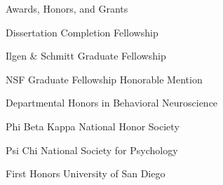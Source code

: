 
\begin{rubric}{Awards, Honors, and Grants}


	

\entry*[August 2020]
	Dissertation Completion Fellowship
	

\entry*[October 2018]
	Ilgen \& Schmitt Graduate Fellowship
	
\entry*[April 2018]
	NSF Graduate Fellowship Honorable Mention
				
\entry*[May 2016]
	Departmental Honors in Behavioral Neuroscience
	
\entry*[February 2016]
	Phi Beta Kappa National Honor Society
	
\entry*[April 2015]
	Psi Chi National Society for Psychology
	
\entry*[2012 - 2016]
	First Honors University of San Diego
	
\end{rubric}
